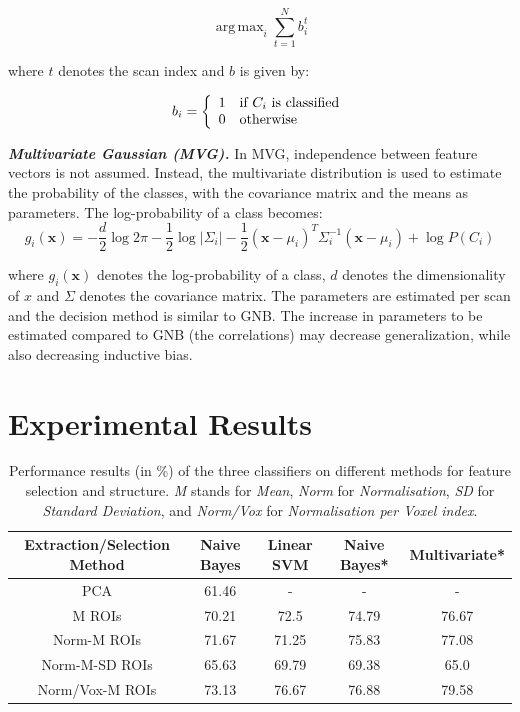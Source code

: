 \documentclass[preprint,journal,11pt]{vgtc}
\begin{document}
\begin{equation}
\label{eq:argmaxsvm}
\operatorname{arg\,max}_i \sum_{t=1}^{N}{b_{i}^{t}}
\end{equation}

where $t$ denotes the scan index and $b$ is given by:

\begin{equation}
b_{i} = \left\{
\begin{array}{l l}
1 \quad \text{if $C_{i}$ is classified}\\
0 \quad \text{otherwise}\\
\end{array} \right.
\end{equation}

\textbf{\emph{Multivariate Gaussian (MVG).}} In MVG, independence between feature vectors is not assumed. Instead, the multivariate distribution is used to estimate the probability of the classes, with the covariance matrix and the means as parameters. The log-probability of a class becomes:
\begin{dmath}
\label{eq:multivariate}
g_{i}(\mathbf{x}) = -\frac{d}{2}\log{2\pi}-\frac{1}{2}\log{|\Sigma_{i}|}-\frac{1}{2}(\mathbf{x}-\mu_{i})^{T}\Sigma_{i}^{-1}(\textbf{x}-\mu_{i})+\log{P(C_{i})}
\end{dmath}

where $g_{i}(\mathbf{x})$ denotes the log-probability of a class, $d$ denotes the dimensionality of $x$ and $\Sigma$ denotes the covariance matrix. The parameters are estimated per scan and the decision method is similar to GNB. The increase in parameters to be estimated compared to GNB (the correlations) may decrease generalization, while also decreasing inductive bias.




\section{Experimental Results}
\label{sec:results}

\begin{table}[htpb]
\centering
{\small
\begin{tabular}{|c|c|c|c|c|}
\hline
\textbf{Extraction/Selection Method} & \textbf{Naive Bayes} & \textbf{Linear SVM} & \textbf{Naive Bayes*} & \textbf{Multivariate*} \\ \hline
PCA & 61.46 &  - & - & - \\
M ROIs & 70.21 & 72.5 & 74.79 & 76.67 \\
Norm-M ROIs & 71.67 & 71.25 & 75.83 & 77.08 \\
Norm-M-SD ROIs & 65.63 & 69.79 & 69.38 & 65.0 \\
Norm/Vox-M ROIs & 73.13 & 76.67 & 76.88 & 79.58 \\
\hline
\end{tabular}}
\caption{Performance results (in \%) of the three classifiers on different methods for feature selection and structure. \emph{M} stands for \emph{Mean}, \emph{Norm} for \emph{Normalisation}, \emph{SD} for \emph{Standard Deviation}, and \emph{Norm/Vox} for \emph{Normalisation per Voxel index}.}
\label{tab:results}
\end{table}
\end{document}
